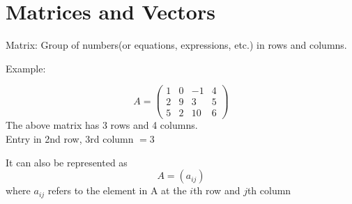 \documentclass{article}
\begin{document}
\section{Matrices and Vectors}
\begin{paragraph}{Matrix:}    
Group of numbers(or equations, expressions, etc.) in rows and columns.
\end{paragraph}
\begin{paragraph}{Example:}

    $$A = \begin{pmatrix}
        1 & 0 & -1 & 4 \\
        2 & 9 & 3 & 5 \\
        5 & 2 & 10 & 6 
    \end{pmatrix}$$
The above matrix has 3 rows and 4 columns.\\[1pt]
Entry in 2nd row, 3rd column $ = 3$

It can also be represented as $$A = (a_{ij})$$ 
where $a_{ij}$ refers to the element in A at the $i$th row and $j$th column

\end{paragraph}
\end{document}
